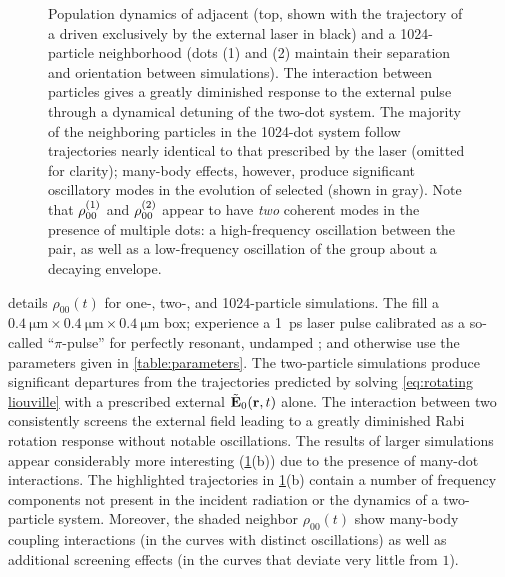 \begin{figure}
  
  \caption{\label{fig:density stats}Population dynamics of adjacent \qds{} (top, shown with the trajectory of a \qd{} driven exclusively by the external laser in black) and a 1024-particle neighborhood (dots (1) and (2) maintain their separation and orientation between simulations).
    The interaction between particles gives a greatly diminished response to the external pulse through a dynamical detuning of the two-dot system.
    The majority of the neighboring particles in the 1024-dot system follow trajectories nearly identical to that prescribed by the laser (omitted for clarity); many-body effects, however, produce significant oscillatory modes in the evolution of selected \qds{} (shown in gray).
    Note that $\rho_{00}^{\qty(1)}$ and $\rho_{00}^{\qty(2)}$ appear to have \emph{two} coherent modes in the presence of multiple dots: a high-frequency oscillation between the pair, as well as a low-frequency oscillation of the group about a decaying envelope.
}
\end{figure}

 details $\rho_{00}(t)$ for one-, two-, and 1024-particle simulations.
The \qds{} fill a $\SI{0.4}{\micro\meter} \times \SI{0.4}{\micro\meter} \times \SI{0.4}{\micro\meter}$ box; experience a \SI{1}{\pico\second} laser pulse calibrated as a so-called ``$\pi$-pulse'' for perfectly resonant, undamped \qds{}; and otherwise use the parameters given in \cref{table:parameters}.
The two-particle simulations produce significant departures from the trajectories predicted by solving \cref{eq:rotating liouville} with a prescribed external $\tilde{\vb{E}}_0(\vb{r}, t)$ alone.
The interaction between two \qds{} consistently screens the external field leading to a greatly diminished Rabi rotation response without notable oscillations.
The results of larger simulations appear considerably more interesting (\cref{fig:density stats}(b)) due to the presence of many-dot interactions.
The highlighted trajectories in \cref{fig:density stats}(b) contain a number of frequency components not present in the incident radiation or the dynamics of a two-particle system.
Moreover, the shaded neighbor $\rho_{00}(t)$ show many-body coupling interactions (in the curves with distinct oscillations) as well as additional screening effects (in the curves that deviate very little from $1$).


